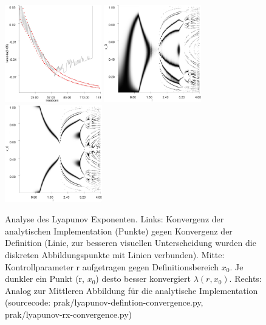 \documentclass{scrartcl}
\begin{document}
\begin{figure}[!htbp]
\includegraphics[height=160px]{lyapunov-definition-convergence}
\includegraphics[height=160px]{lyapunov-normiert-xr}
\includegraphics[height=160px]{lyapunov-analytisch-xr}
\caption{Analyse des Lyapunov Exponenten. Links: Konvergenz der analytischen Implementation (Punkte) gegen Konvergenz der Definition (Linie, zur besseren visuellen Unterscheidung wurden die diskreten Abbildungspunkte mit Linien verbunden). Mitte: Kontrollparameter r aufgetragen gegen Definitionsbereich $x_0$. Je dunkler ein Punkt (r, $x_0$) desto besser konvergiert $\lambda(r,x_0)$. Rechts: Analog zur Mittleren Abbildung für die analytische Implementation (sourcecode: prak/lyapunov-defintion-convergence.py, prak/lyapunov-rx-convergence.py)} 
\label{fig:lyapunov}
\end{figure}
 
\end{document}
